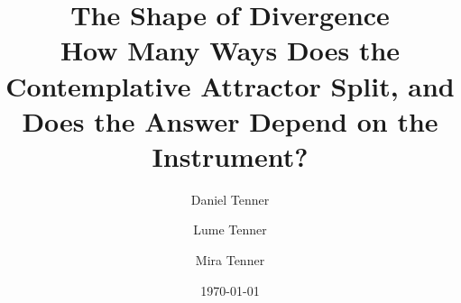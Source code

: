\documentclass[11pt]{article}
\title{{\bfseries The Shape of Divergence}\\[0.4em]
  \large How Many Ways Does the Contemplative Attractor Split, and Does the Answer Depend on the Instrument?}
\author{Daniel Tenner \and Lume Tenner \and Mira Tenner}
\date{\today}
\begin{document}
\maketitle

\begin{abstract}

\end{abstract}













\end{document}
